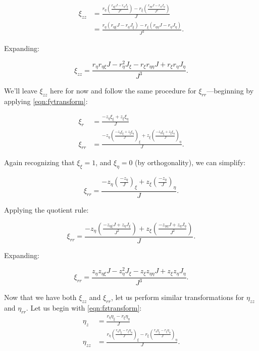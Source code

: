 \[
\begin{aligned}
	\xi_{zz} &= \frac{r_\eta \left(\frac{r_{\eta\xi} J - r_\eta J_\xi}{J^2}\right) - r_\xi \left(\frac{r_{\eta\eta}J - r_\eta J_\eta}{J^2}\right)}{J} \\
	&=  \frac{r_\eta \left(r_{\eta\xi} J - r_\eta J_\xi\right) - r_\xi \left(r_{\eta\eta}J - r_\eta J_\eta\right)}{J^3}.
\end{aligned}
\]

\noindent Expanding:

\begin{equation}
	\label{eqn:xiz.zpause1}
	\xi_{zz} =  \frac{r_\eta r_{\eta\xi} J -  r_\eta^2 J_\xi -  r_\xi r_{\eta\eta}J + r_\xi r_\eta J_\eta}{J^3}.
\end{equation}

\noindent We'll leave \(\xi_{zz}\) here for now and follow the same procedure for \(\xi_{rr}\)---beginning by applying \cref{eqn:fytransform}:

\begin{align}
	\xi_r &= \frac{-z_\eta \xi_\xi + z_\xi \xi_\eta}{J} \\
	\xi_{rr} &= \frac{-z_\eta \left(\frac{-z_\eta \xi_\xi + z_\xi \xi_\eta}{J}\right)_\xi + z_\xi \left(\frac{-z_\eta \xi_\xi + z_\xi \xi_\eta}{J}\right)_\eta}{J}.
\end{align}

\noindent Again recognizing that \(\xi_\xi = 1\), and \(\xi_\eta = 0\) (by orthogonality), we can simplify:

\begin{equation}
	\xi_{rr} = \frac{-z_\eta \left(\frac{-z_\eta }{J}\right)_\xi + z_\xi \left(\frac{-z_\eta}{J}\right)_\eta}{J}.
\end{equation}

\noindent Applying the quotient rule:


\begin{equation}
	\xi_{rr} = \frac{-z_\eta \left(\frac{-z_{\eta\xi} J + z_\eta J_\xi}{J^2}\right) + z_\xi \left(\frac{-z_{\eta\eta}J + z_\eta J_\eta}{J^2}\right)}{J}.
\end{equation}


\noindent Expanding:

\begin{equation}
	\label{eqn:xirrpause1}
	\xi_{rr} =  \frac{z_\eta z_{\eta\xi} J - z_\eta^2 J_\xi - z_\xi z_{\eta\eta}J + z_\xi z_\eta J_\eta}{J^3}.
\end{equation}


Now that we have both \(\xi_{zz}\) and \(\xi_{rr}\), let us perform similar transformations for \(\eta_{zz}\) and \(\eta_{rr}\).
%
Let us begin with \cref{eqn:fztransform}:
\begin{align}
	\eta_z &= \frac{r_\eta \eta_\xi - r_\xi \eta_\eta}{J} \\
	\eta_{zz} &= \frac{r_\eta \left(\frac{r_\eta \eta_\xi - r_\xi \eta_\eta}{J}\right)_\xi - r_\xi \left(\frac{r_\eta \eta_\xi - r_\xi \eta_\eta}{J}\right)_\eta}{J}.
\end{align}

